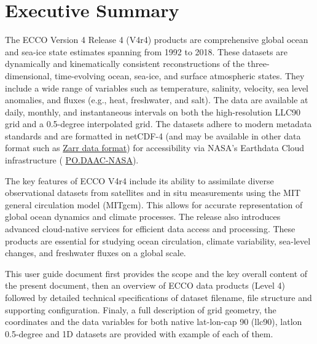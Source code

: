 \pagebreak\section{Executive Summary}
\par \vspace{0.5cm}

The ECCO Version 4 Release 4 (V4r4) products are comprehensive global ocean and sea-ice state estimates spanning from 1992 to 2018. These datasets are dynamically and kinematically consistent reconstructions of the three-dimensional, time-evolving ocean, sea-ice, and surface atmospheric states. They include a wide range of variables such as temperature, salinity, velocity, sea level anomalies, and fluxes (e.g., heat, freshwater, and salt). The data are available at daily, monthly, and instantaneous intervals on both the high-resolution LLC90 grid and a 0.5-degree interpolated grid. The datasets adhere to modern metadata standards and are formatted in netCDF-4 (and may be available in other data format such as \hyperlink{https://en.wikipedia.org/wiki/Zarr_(data_format)}{Zarr data format}) for accessibility via NASA's Earthdata Cloud infrastructure ( \hyperlink{https://podaac.jpl.nasa.gov/}{PO.DAAC-NASA}).

The key features of ECCO V4r4 include its ability to assimilate diverse observational datasets from satellites and in situ measurements using the MIT general circulation model (MITgcm). This allows for accurate representation of global ocean dynamics and climate processes. The release also introduces advanced cloud-native services for efficient data access and processing. These products are essential for studying ocean circulation, climate variability, sea-level changes, and freshwater fluxes on a global scale.

This user guide document first provides the scope and the key overall content of the present document, then an overview of ECCO data products (Level 4) followed by detailed technical specifications of dataset filename, file structure and supporting configuration. Finaly, a full description of grid geometry, the coordinates and the data variables for both native lat-lon-cap 90 (llc90), latlon 0.5-degree and 1D datasets are provided with example of each of them.



